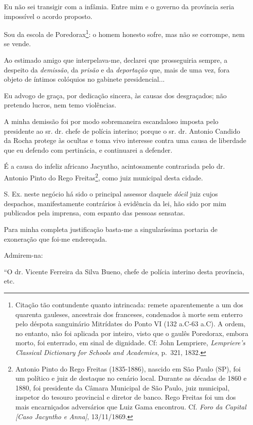 Eu não sei transigir com a infâmia. Entre mim e o governo da província
seria impossível o acordo proposto.

Sou da escola de Poredorax\footnote{Citação tão contundente quanto
  intrincada: remete aparentemente a um dos quarenta gauleses,
  ancestrais dos franceses, condenados à morte sem enterro pelo déspota
  sanguinário Mitrídates do Ponto VI (132 a.C-63 a.C). A ordem, no
  entanto, não foi aplicada por inteiro, visto que o gaulês Poredorax,
  embora morto, foi enterrado, em sinal de dignidade. Cf: John
  Lempriere, \emph{Lempriere's Classical Dictionary for Schools and
  Academies}, p.~321, 1832.}: o homem honesto sofre, mas não se
corrompe, nem se vende.

Ao estimado amigo que interpelava-me, declarei que prosseguiria sempre,
a despeito da \emph{demissão}, da \emph{prisão} e da \emph{deportação}
que, mais de uma vez, fora objeto de íntimos colóquios no gabinete
presidencial...

Eu advogo de graça, por dedicação sincera, às causas dos desgraçados;
não pretendo lucros, nem temo violências.

A minha demissão foi por modo sobremaneira escandaloso imposta pelo
presidente ao sr. dr. chefe de polícia interino; porque o sr. dr.
Antonio Candido da Rocha protege às ocultas e toma vivo interesse contra
uma causa de liberdade que eu defendo com pertinácia, e continuarei a
defender.

É a causa do infeliz africano Jacyntho, acintosamente contrariada pelo
dr. Antonio Pinto do Rego Freitas\footnote{Antonio Pinto do Rego
  Freitas (1835-1886), nascido em São Paulo (SP), foi um político e juiz
  de destaque no cenário local. Durante as décadas de 1860 e 1880, foi
  presidente da Câmara Municipal de São Paulo, juiz municipal, inspetor
  do tesouro provincial e diretor de banco. Rego Freitas foi um dos mais
  encarniçados adversários que Luiz Gama encontrou. Cf. \emph{Foro da
  Capital {[}Caso Jacyntho e Anna{]}}, 13/11/1869.}, como juiz municipal
desta cidade.

S. Ex. neste negócio há sido o principal assessor daquele \emph{dócil}
juiz cujos despachos, manifestamente contrários à evidência da lei, hão
sido por mim publicados pela imprensa, com espanto das pessoas sensatas.

Para minha completa justificação basta-me a singularíssima portaria de
exoneração que foi-me endereçada.

Admirem-na:

``O dr. Vicente Ferreira da Silva Bueno, chefe de polícia interino desta
província, etc.

